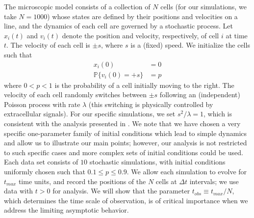 \documentclass[3p]{elsarticle}
\begin{document}
The microscopic model consists of a collection of $N$ cells (for our simulations, we take $N=1000$) whose states are 
defined by their positions and velocities on a line, and the dynamics of each cell are governed by a stochastic process.
%
Let $x_i(t)$ and $v_i(t)$ denote the position and velocity, respectively, of cell $i$ at time $t$.
%
The velocity of each cell is $\pm s$, where $s$ is a (fixed) speed.
%
We initialize the cells such that
\begin{equation}\label{eqn:system}
\begin{aligned}
x_i(0) & = 0 \\
\mathbb{P} \{ v_i(0) = +s \} & = p
\end{aligned}
\end{equation}
where $0 < p < 1$ is the probability of a cell initially moving to the right.
%
The velocity of each cell randomly switches between $\pm s$ following an (independent) Poisson process with rate $\lambda$ (this switching is physically controlled by extracellular signals).
%
For our specific simulations, we set $s^2/\lambda=1$, which is consistent with the analysis presented in \cite{othmer1988models}.
%
We note that we have chosen a very specific one-parameter family of initial conditions which lead to simple dynamics and allow us to illustrate our main points;
however, our analysis is not restricted to such specific cases and more complex sets of initial conditions could be used.
%
Each data set consists of $10$ stochastic simulations, with initial conditions uniformly chosen such that $0.1 \le p  \le 0.9$.
%
We allow each simulation to evolve for $t_{max}$ time units, and record the positions of the $N$ cells at $\Delta t$ intervals; we use data with $t > 0$ for analysis.
%
We will show that the parameter $t_{obs} \equiv t_{max}/N$, which determines the time scale of observation, is of critical importance when we address the limiting asymptotic behavior.
\end{document}

